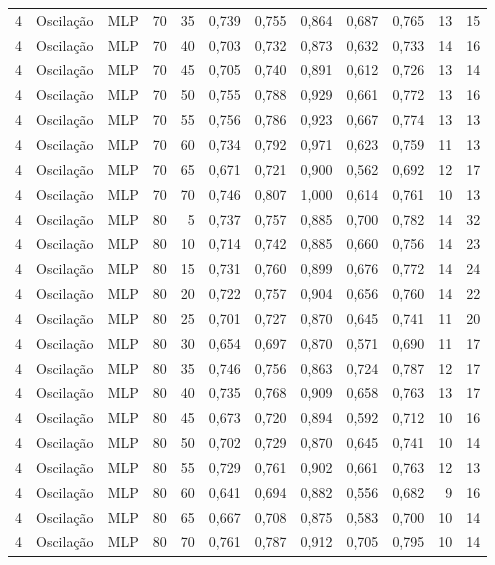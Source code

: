 \begin{longtable}{ccclrrrrrrrr}
4 & Oscilação & MLP & 70 & 35 & 0,739 & 0,755 & 0,864 & 0,687 & 0,765 & 13 & 15 \\
4 & Oscilação & MLP & 70 & 40 & 0,703 & 0,732 & 0,873 & 0,632 & 0,733 & 14 & 16 \\
4 & Oscilação & MLP & 70 & 45 & 0,705 & 0,740 & 0,891 & 0,612 & 0,726 & 13 & 14 \\
4 & Oscilação & MLP & 70 & 50 & 0,755 & 0,788 & 0,929 & 0,661 & 0,772 & 13 & 16 \\
4 & Oscilação & MLP & 70 & 55 & 0,756 & 0,786 & 0,923 & 0,667 & 0,774 & 13 & 13 \\
4 & Oscilação & MLP & 70 & 60 & 0,734 & 0,792 & 0,971 & 0,623 & 0,759 & 11 & 13 \\
4 & Oscilação & MLP & 70 & 65 & 0,671 & 0,721 & 0,900 & 0,562 & 0,692 & 12 & 17 \\
4 & Oscilação & MLP & 70 & 70 & 0,746 & 0,807 & 1,000 & 0,614 & 0,761 & 10 & 13 \\
4 & Oscilação & MLP & 80 & 5 & 0,737 & 0,757 & 0,885 & 0,700 & 0,782 & 14 & 32 \\
4 & Oscilação & MLP & 80 & 10 & 0,714 & 0,742 & 0,885 & 0,660 & 0,756 & 14 & 23 \\
4 & Oscilação & MLP & 80 & 15 & 0,731 & 0,760 & 0,899 & 0,676 & 0,772 & 14 & 24 \\
4 & Oscilação & MLP & 80 & 20 & 0,722 & 0,757 & 0,904 & 0,656 & 0,760 & 14 & 22 \\
4 & Oscilação & MLP & 80 & 25 & 0,701 & 0,727 & 0,870 & 0,645 & 0,741 & 11 & 20 \\
4 & Oscilação & MLP & 80 & 30 & 0,654 & 0,697 & 0,870 & 0,571 & 0,690 & 11 & 17 \\
4 & Oscilação & MLP & 80 & 35 & 0,746 & 0,756 & 0,863 & 0,724 & 0,787 & 12 & 17 \\
4 & Oscilação & MLP & 80 & 40 & 0,735 & 0,768 & 0,909 & 0,658 & 0,763 & 13 & 17 \\
4 & Oscilação & MLP & 80 & 45 & 0,673 & 0,720 & 0,894 & 0,592 & 0,712 & 10 & 16 \\
4 & Oscilação & MLP & 80 & 50 & 0,702 & 0,729 & 0,870 & 0,645 & 0,741 & 10 & 14 \\
4 & Oscilação & MLP & 80 & 55 & 0,729 & 0,761 & 0,902 & 0,661 & 0,763 & 12 & 13 \\
4 & Oscilação & MLP & 80 & 60 & 0,641 & 0,694 & 0,882 & 0,556 & 0,682 & 9 & 16 \\
4 & Oscilação & MLP & 80 & 65 & 0,667 & 0,708 & 0,875 & 0,583 & 0,700 & 10 & 14 \\
4 & Oscilação & MLP & 80 & 70 & 0,761 & 0,787 & 0,912 & 0,705 & 0,795 & 10 & 14 \\

\end{longtable}
